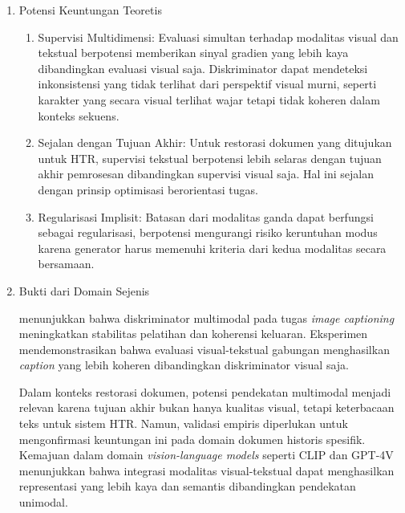 \documentclass[12pt,a4paper]{article}
\begin{document}
\begin{enumerate}[leftmargin=*, labelindent=0pt, itemsep=1ex, topsep=0pt]

\item Potensi Keuntungan Teoretis

\begin{enumerate}[leftmargin=1.5em, labelsep=0.5em, itemindent=0pt, label=\alph*., topsep=0pt, parsep=0pt, itemsep=0pt]
      \item Supervisi Multidimensi: \mbox{} Evaluasi simultan terhadap modalitas visual dan tekstual berpotensi memberikan sinyal gradien yang lebih kaya dibandingkan evaluasi visual saja. Diskriminator dapat mendeteksi inkonsistensi yang tidak terlihat dari perspektif visual murni, seperti karakter yang secara visual terlihat wajar tetapi tidak koheren dalam konteks sekuens.

      \item Sejalan dengan Tujuan Akhir: \mbox{} Untuk restorasi dokumen yang ditujukan untuk HTR, supervisi tekstual berpotensi lebih selaras dengan tujuan akhir pemrosesan dibandingkan supervisi visual saja. Hal ini sejalan dengan prinsip optimisasi berorientasi tugas.

      \item Regularisasi Implisit: \mbox{} Batasan dari modalitas ganda dapat berfungsi sebagai regularisasi, berpotensi mengurangi risiko keruntuhan modus karena generator harus memenuhi kriteria dari kedua modalitas secara bersamaan.
\end{enumerate}

\item Bukti dari Domain Sejenis

\textcite{wei2022} menunjukkan bahwa diskriminator multimodal pada tugas \textit{image captioning} meningkatkan stabilitas pelatihan dan koherensi keluaran. Eksperimen mendemonstrasikan bahwa evaluasi visual-tekstual gabungan menghasilkan \textit{caption} yang lebih koheren dibandingkan diskriminator visual saja.

Dalam konteks restorasi dokumen, potensi pendekatan multimodal menjadi relevan karena tujuan akhir bukan hanya kualitas visual, tetapi keterbacaan teks untuk sistem HTR. Namun, validasi empiris diperlukan untuk mengonfirmasi keuntungan ini pada domain dokumen historis spesifik. Kemajuan dalam domain \textit{vision-language models} seperti CLIP dan GPT-4V menunjukkan bahwa integrasi modalitas visual-tekstual dapat menghasilkan representasi yang lebih kaya dan semantis dibandingkan pendekatan unimodal.

\end{enumerate}
\end{document}
